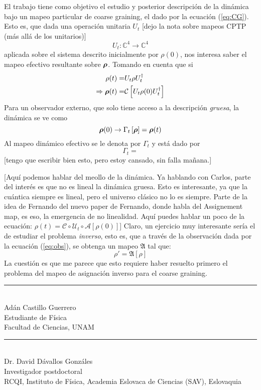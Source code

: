 \documentclass[onecolumn,11pt]{article}
\newcommand{\mcU}{\mathcal{U}}
\newcommand{\mcC}{\mathcal{C}}
\newcommand{\mcA}{\mathcal{A}}
\newcommand{\Cc}{\mathcal{C}} %
\newcommand{\Hh}{\mathbb{C}} %
\newcommand{\CG}[1]{\Cc\left[#1\right]}
\newcommand*{\B}[1]{\ifmmode\bm{#1}\else\textbf{#1}\fi}
\newcommand{\nota}[1]{{\color{red} [#1]}}
\newcommand{\notaAd}[1]{{\color{blue} [#1]}} %
\begin{document}
El trabajo tiene como objetivo el estudio y posterior descripción de la dinámica bajo un mapeo particular de coarse graining, el dado por la ecuación (\ref{eq:CG}). Esto es, que dada una operación unitaria $U_{t}$ \notaAd{dejo la nota sobre mapeos CPTP (más allá de los unitarios)}
\begin{equation}
    U_{t}:\Hh^{4}\rightarrow\Hh^{4}
\end{equation}
aplicada sobre el sistema descrito inicialmente por $\rho(0)$, nos interesa saber el mapeo efectivo resultante sobre $\B{\rho}$. Tomando en cuenta que si
\begin{align}
    \rho(t)=&U_{t}\rho U_{t}^{\dag}\\
    \Rightarrow \B{\rho}(t)=&\CG{U_{t}\rho(0) U_{t}^{\dag}}
\end{align}
Para un observador externo, que solo tiene acceso a la descripción \textit{gruesa}, la dinámica se ve como
\begin{equation}\label{eq:obs}
    \B{\rho}(0)\rightarrow\Gamma_{t}\left[\B{\rho}\right]=\B{\rho}(t)
\end{equation}
Al mapeo dinámico efectivo se le denota por $\Gamma_{t}$ y está dado por
\begin{equation}
    \Gamma_{t}=
\end{equation}
\notaAd{tengo que escribir bien esto, pero estoy cansado, sin falla mañana.}


\nota{Aquí podemos hablar del meollo de la dinámica. Ya hablando con Carlos, parte del interés es que no es lineal la dinámica gruesa. Esto es interesante, ya que la cuántica siempre es lineal, pero el universo clásico no lo es siempre. Parte de la idea de Fernando del nuevo paper de Fernando, donde habla del Assignement map, es eso, la emergencia de no linealidad. Aquí puedes hablar un poco de la ecuación: $\rho(t)=\mcC \circ \mcU_t \circ \mcA [\rho(0)]$} Claro, un ejercicio muy interesante sería el de estudiar el problema \textit{inverso}, esto es, que a través de la observación dada por la ecuación (\ref{eq:obs}), se obtenga un mapeo $\mathfrak{A}$ tal que:
\begin{equation}
    \rho'=\mathfrak{A}\left[\rho\right]
\end{equation}
La cuestión es que me parece que esto requiere haber resuelto primero el problema del mapeo de asignación inverso para el coarse graining.


\begin{center}
    \rule{200pt}{0.4pt}\\
    Adán Castillo Guerrero \\
    Estudiante de Física \\
    Facultad de Ciencias, UNAM \\
    
\end{center}

\vspace{1.0cm}

\begin{center}
    \rule{200pt}{0.4pt}\\
    Dr. David Dávallos Gonzáles \\
    Investigador postdoctoral \\
    RCQI, Instituto de Física, Academia Eslovaca de Ciencias (SAV), Eslovaquia\\
    
\end{center}


\end{document}
